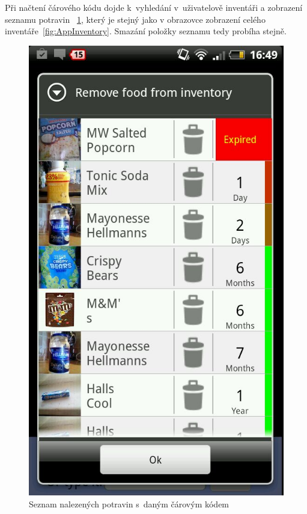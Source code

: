 \documentclass[thesis=B,czech]{FITthesis}[2013/10/20]
\begin{document}
Při načtení čárového kódu dojde k~vyhledání v~uživatelově inventáři a zobrazení seznamu potravin ~\ref{fig:AppScanRemoveList}, který je stejný jako v obrazovce zobrazení celého inventáře~\ref{fig:AppInventory}. Smazání položky seznamu tedy probíha stejně.

\begin{figure}[H]
  \centering
  \includegraphics[scale=0.4]{screenshots/app_scan_remove_list.jpg}
  \caption{Seznam nalezených potravin s~daným čárovým kódem}
  \label{fig:AppScanRemoveList}
\end{figure}
\end{document}
